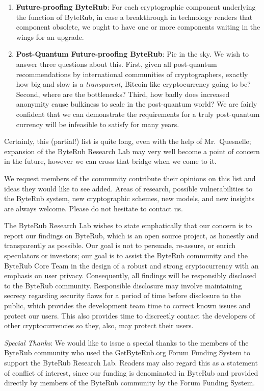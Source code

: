 \documentclass[12pt,english]{mrl}
\theoremstyle{definition}
\numberwithin{equation}{section}
\numberwithin{figure}{section}
\numberwithin{equation}{section}
\numberwithin{equation}{section}
\numberwithin{figure}{section}
\begin{document}
\begin{enumerate}[1.]
    \item \textbf{Future-proofing ByteRub}: For each cryptographic component underlying the function of ByteRub, in case a breakthrough in technology renders that component obsolete, we ought to have one or more components waiting in the wings for an upgrade.
    
    \item \textbf{Post-Quantum Future-proofing ByteRub}: Pie in the sky. We wish to answer three questions about this. First, given all post-quantum recommendations by international communities of cryptographers, exactly how big and slow is a \textit{transparent}, Bitcoin-like cryptocurrency going to be? Second, where are the bottlenecks? Third, how badly does increased anonymity cause bulkiness to scale in the post-quantum world? We are fairly confident that we can demonstrate the requirements for a truly post-quantum currency will be infeasible to satisfy for many years.
    
    
    
    
    
\end{enumerate}


Certainly, this (partial!) list is quite long, even with the help of Mr.\ Quesnelle; expansion of the ByteRub Research Lab may very well become a point of concern in the future, however we can cross that bridge when we come to it. 

We request members of the community contribute their opinions on this list and ideas they would like to see added. Areas of research, possible vulnerabilities to the ByteRub system, new cryptographic schemes, new models, and new insights are always welcome. Please do not hesitate to contact us.  

The ByteRub Research Lab wishes to state emphatically that our concern is to report our findings on ByteRub, which is an open source project, as honestly and transparently as possible. Our goal is not to persuade, re-assure, or enrich speculators or investors; our goal is to assist the ByteRub community and the ByteRub Core Team in the design of a robust and strong cryptocurrency with an emphasis on user privacy.  Consequently, all findings will be responsibly disclosed to the ByteRub community. Responsible disclosure may involve maintaining secrecy regarding security flaws for a period of time before disclosure to the public, which provides the development team time to correct known issues and protect our users. This also provides time to discreetly contact the developers of other cryptocurrencies so they, also, may protect their users.




\emph{Special Thanks}: We would like to issue a special thanks to the members of the ByteRub community who used the GetByteRub.org Forum Funding System to support the ByteRub Research Lab. Readers may also regard this as a statement of conflict of interest, since our funding is denominated in ByteRub and provided directly by members of the ByteRub community by the Forum Funding System.

\medskip{}



\end{document}
